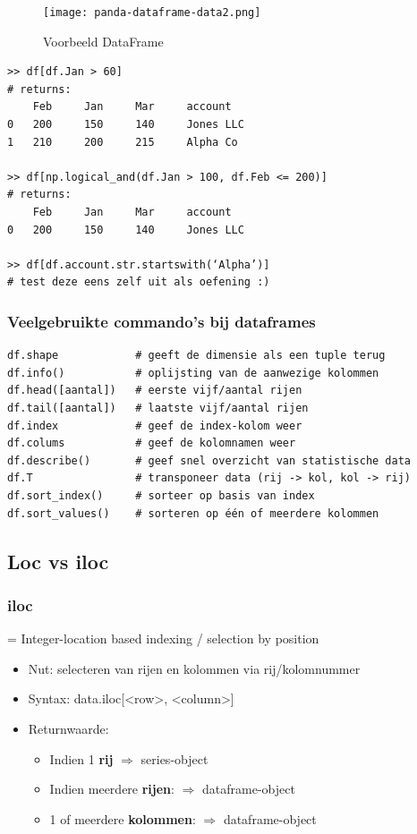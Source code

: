 \documentclass{article}
\begin{document}
\begin{figure}[H]
    \centering
    \texttt{[image: panda-dataframe-data2.png]}
    \caption{Voorbeeld DataFrame}
\end{figure}

\begin{verbatim}
>> df[df.Jan > 60]
# returns:
    Feb     Jan     Mar     account
0   200     150     140     Jones LLC
1   210     200     215     Alpha Co

>> df[np.logical_and(df.Jan > 100, df.Feb <= 200)]
# returns:
    Feb     Jan     Mar     account
0   200     150     140     Jones LLC

>> df[df.account.str.startswith(‘Alpha’)]
# test deze eens zelf uit als oefening :)
\end{verbatim}

\subsubsection{Veelgebruikte commando's bij dataframes}

\begin{verbatim}
df.shape            # geeft de dimensie als een tuple terug
df.info()           # oplijsting van de aanwezige kolommen
df.head([aantal])   # eerste vijf/aantal rijen
df.tail([aantal])   # laatste vijf/aantal rijen
df.index            # geef de index-kolom weer
df.colums           # geef de kolomnamen weer
df.describe()       # geef snel overzicht van statistische data
df.T                # transponeer data (rij -> kol, kol -> rij)
df.sort_index()     # sorteer op basis van index
df.sort_values()    # sorteren op één of meerdere kolommen
\end{verbatim}


\subsection{Loc vs iloc}

\subsubsection{iloc}

= Integer-location based indexing / selection by position

\begin{itemize}
    \item Nut: selecteren van rijen en kolommen via rij/kolomnummer
    \item Syntax: data.iloc[<row>, <column>]
    \item Returnwaarde:
    \begin{itemize}
        \item Indien 1 \textbf{rij} $\Rightarrow$ series-object
        \item Indien meerdere \textbf{rijen}: $\Rightarrow$ dataframe-object
        \item 1 of meerdere \textbf{kolommen}: $\Rightarrow$ dataframe-object 
    \end{itemize}
\end{itemize}
\end{document}
